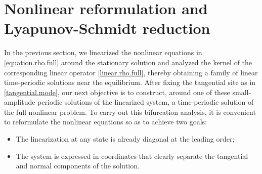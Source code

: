 \documentclass[a4paper,reqno,10pt]{article}
\begin{document}
\section{Nonlinear reformulation and Lyapunov-Schmidt reduction}\label{Luap-Schm}
In the previous section, we linearized the nonlinear equations in \eqref{equation.rho.full} around the stationary solution and analyzed the kernel of the corresponding linear operator \eqref{linear.rho.full}, thereby obtaining a family of linear time-periodic solutions near the equilibrium. After fixing the tangential site as in \eqref{tangential.mode}, our next objective is to construct, around  one of these small-amplitude periodic solutions  of the linearized system, a time-periodic solution of the full nonlinear problem. 
To carry out this bifurcation analysis, it is convenient to reformulate the nonlinear equations so as to achieve two goals:
\begin{itemize}
    \item  The linearization at any state is already diagonal at the leading order; 
     \item The system is expressed in coordinates that clearly separate the tangential and normal components of the solution.
\end{itemize}
\end{document}
